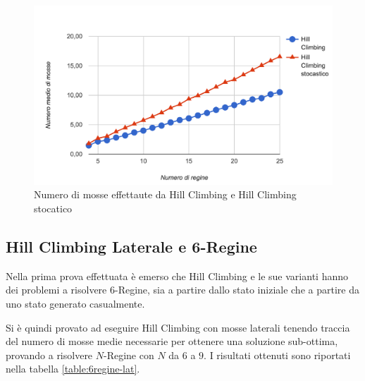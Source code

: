 \begin{figure}[ht]
\centering
\includegraphics[width=\textwidth]{./immagini/stocastico2.png}
\caption{Numero di mosse effettaute da Hill Climbing e Hill Climbing stocatico}
\label{fig:stocastico2}
\end{figure}



\FloatBarrier
\subsection{Hill Climbing Laterale e 6-Regine}\label{prove:6regine}

Nella prima prova effettuata è emerso che Hill Climbing e le sue varianti hanno dei problemi a risolvere 6-Regine, sia a partire dallo stato iniziale che a partire da uno stato generato casualmente.

Si è quindi provato ad eseguire Hill Climbing con mosse laterali tenendo traccia del numero di mosse medie necessarie per ottenere una soluzione sub-ottima, provando a risolvere $N$-Regine con $N$ da $6$ a $9$. I risultati ottenuti sono riportati nella tabella \ref{table:6regine-lat}.

